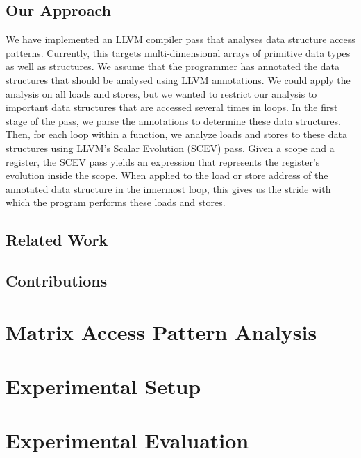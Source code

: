 \documentclass[letterpaper]{article}
\begin{document}
\subsection{Our Approach}

We have implemented an LLVM compiler pass that analyses data structure access patterns.
Currently, this targets multi-dimensional arrays of primitive data types as well as structures.
We assume that the programmer has annotated the data structures that should be
analysed using LLVM annotations.
We could apply the analysis on all loads and stores, but we wanted to restrict our
analysis to important data structures that are accessed several times in loops.
In the first stage of the pass, we parse the annotations to determine these data structures.
Then, for each loop within a function, we analyze loads and stores to these
data structures using LLVM's Scalar Evolution (SCEV) pass. Given a scope and a
register, the SCEV pass yields an expression that represents the register's
evolution inside the scope. When applied to the load or store address of the
annotated data structure in the innermost loop, this gives us the stride
with which the program performs these loads and stores.

\subsection{Related Work}

\subsection{Contributions}

\section{Matrix Access Pattern Analysis}

\section{Experimental Setup}

\section{Experimental Evaluation}
\end{document}
